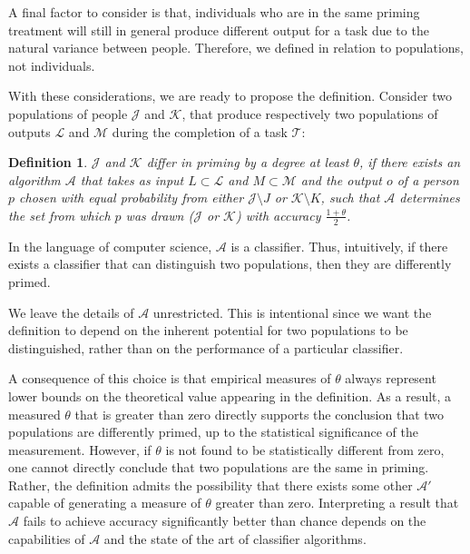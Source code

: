 \documentclass[a4paper]{report}
\newtheorem*{mydef}{Definition}
\begin{document}
A final factor to consider is that, individuals who are in the same priming 
treatment will still in general produce different output for a task
due to the natural variance between people.  Therefore, we defined in relation 
to populations, not individuals.

With these considerations, we are ready to propose the definition.
Consider two populations of people $\mathcal{J}$ and $\mathcal{K}$, that 
produce respectively two populations of outputs 
$\mathcal{L}$ and $\mathcal{M}$ during the completion of a task $\mathcal{T}$: 

\vspace{2mm}
\begin{mydef}
	\upshape
	$\mathcal{J}$ and $\mathcal{K}$ 
	\emph{differ in priming by a degree at least $\theta$},
	if there exists an algorithm $\mathcal{A}$ that takes as input 
	$L \subset \mathcal{L}$ and $M \subset \mathcal{M}$ and the output 
	$o$ of a person $p$ chosen with equal probability from either 
	$\mathcal{J}\setminus J$ or $\mathcal{K}\setminus K$, 
	such that $\mathcal{A}$ determines the set from which $p$ was drawn
	($\mathcal{J}$ or $\mathcal{K}$) with accuracy $\frac{1+\theta}{2}$.  
\end{mydef}

In the language of computer science, $\mathcal{A}$ is a classifier.  Thus,
intuitively, if there exists a classifier that can distinguish two populations,
then they are differently primed.

We leave the details of $\mathcal{A}$ unrestricted.  This is 
intentional since we want the definition to depend on the inherent 
potential for two populations to be distinguished, rather than on the 
performance of a particular classifier.

A consequence of this choice is that empirical measures of $\theta$ always
represent lower bounds on the theoretical value appearing in the definition.
As a result, a measured $\theta$ that is greater than zero directly 
supports the conclusion that two populations are differently 
primed, up to the statistical significance of the measurement.  However, if 
$\theta$ is not found to be statistically different from zero, one cannot 
directly
conclude that two populations are the same in priming.  Rather, the definition
admits the possibility that there exists some other $\mathcal{A}'$ capable of 
generating a measure of $\theta$ greater than zero. Interpreting a result
that $\mathcal{A}$ fails to achieve accuracy significantly better than 
chance depends on the capabilities of $\mathcal{A}$ and the state of the art
of classifier algorithms.
\end{document}
